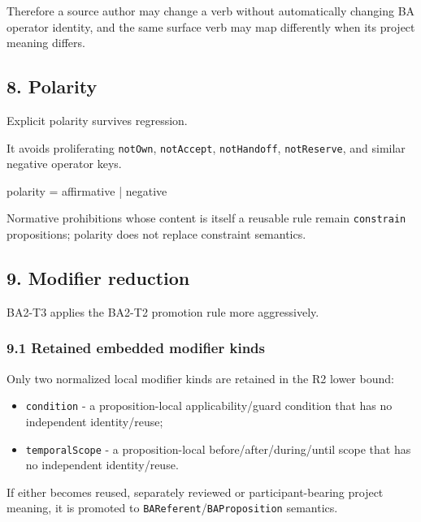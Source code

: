 \documentclass[
  10pt,
  a4paper,
]{article}
\newenvironment{Shaded}{}{}
\newcommand{\NormalTok}[1]{#1}
\providecommand{\tightlist}{%
  \setlength{\itemsep}{0pt}\setlength{\parskip}{0pt}}
\begin{document}
Therefore a source author may change a verb without automatically
changing BA operator identity, and the same surface verb may map
differently when its project meaning differs.

\subsection{8. Polarity}\label{8-polarity}

Explicit polarity survives regression.

It avoids proliferating \texttt{notOwn}, \texttt{notAccept},
\texttt{notHandoff}, \texttt{notReserve}, and similar negative operator
keys.

\begin{Shaded}
\begin{Highlighting}[]
\NormalTok{polarity = affirmative | negative}
\end{Highlighting}
\end{Shaded}

Normative prohibitions whose content is itself a reusable rule remain
\texttt{constrain} propositions; polarity does not replace constraint
semantics.

\subsection{9. Modifier reduction}\label{9-modifier-reduction}

BA2-T3 applies the BA2-T2 promotion rule more aggressively.

\subsubsection{9.1 Retained embedded modifier
kinds}\label{91-retained-embedded-modifier-kinds}

Only two normalized local modifier kinds are retained in the R2 lower
bound:

\begin{itemize}
\tightlist
\item
  \texttt{condition} - a proposition-local applicability/guard condition
  that has no independent identity/reuse;
\item
  \texttt{temporalScope} - a proposition-local before/after/during/until
  scope that has no independent identity/reuse.
\end{itemize}

If either becomes reused, separately reviewed or participant-bearing
project meaning, it is promoted to
\texttt{BAReferent}/\texttt{BAProposition} semantics.
\end{document}
